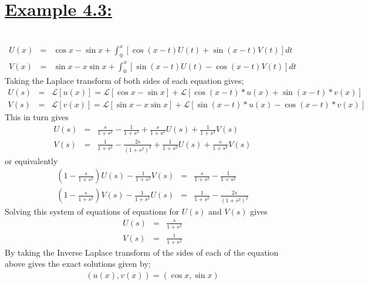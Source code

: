 \documentclass[11pt]{report}
\newcommand{\ubt}[1]{\textbf{\underline{#1}}}
\newcommand{\sps}{\\[0.2cm]}
\newcommand{\spn}[1]{\\[#1cm]}
\newcommand{\example}[1]{\section*{\ubt{Example #1:}}{~}\spn{-1.7}}
\begin{document}
	\example{4.3}
	\begin{eqnarray*}
		U(x) &=& \cos x - \sin x + \int_{0}^{x} [\cos(x - t)U(t) + \sin(x - t)V(t)]dt\sps
		V(x) &=&  \sin x - x\sin x +\int_{0}^{x} [\sin(x - t)U(t) - \cos(x - t)V(t)]dt
	\end{eqnarray*}
	Taking the Laplace transform of both sides of each equation gives;
	\begin{eqnarray*}
		U(s) &=& \mathcal{L}[u(x)] = \mathcal{L}[\cos x - \sin x] + \mathcal{L}[\cos(x - t) * u(x) + \sin(x - t) * v(x)]\sps
		V(s) &=& \mathcal{L}[v(x)] = \mathcal{L}[\sin x - x\sin x] + \mathcal{L}[\sin(x - t) * u(x) - \cos(x - t) * v(x)]
	\end{eqnarray*}
	This in turn gives
	\begin{eqnarray*}
		U(s) &=& \frac{s}{1 + s^2} - \frac{1}{1 + s^2} + \frac{s}{1 + s^2}U(s) + \frac{1}{1 + s^2}V(s)\sps
		V(s) &=& \frac{1}{1 + s^2} - \frac{2s}{(1 + s^2)^2} + \frac{1}{1 + s^2}U(s) + \frac{s}{1 + s^2}V(s)	
	\end{eqnarray*}
	or equivalently
	\begin{eqnarray*}
		(1 - \frac{s}{1+s^2})U(s) - \frac{1}{1+s^2}V(s) &=& \frac{s}{1 + s^2} - \frac{1}{1 + s^2}\sps
		(1 - \frac{s}{1+s^2})V(s) - \frac{1}{1+s^2}U(s) &=& \frac{1}{1 + s^2} - \frac{2s}{(1 + s^2)^2}
	\end{eqnarray*}	
	Solving this system of equations of equations for $U(s)$ and $V(s)$ gives
	\begin{eqnarray*}
		U(s) &=& \frac{s}{1+s^2}\sps
		V(s) &=& \frac{1}{1+s^2}
	\end{eqnarray*}
	By taking the Inverse Laplace transform of the sides of each of the equation above gives the exact solutions given by;
	\begin{eqnarray*}
		(u(x), v(x)) =(\cos x, \sin x)
	\end{eqnarray*}
\end{document}
